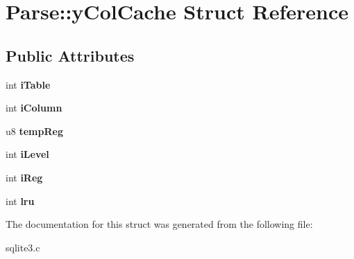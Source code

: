 \hypertarget{struct_parse_1_1y_col_cache}{\section{Parse\-:\-:y\-Col\-Cache Struct Reference}
\label{struct_parse_1_1y_col_cache}
}
\subsection*{Public Attributes}
\begin{DoxyCompactItemize}
\item 
\hypertarget{struct_parse_1_1y_col_cache_a7d99a4e00555cb0ff7fb3990bb7b549e}{int {\bfseries i\-Table}}\label{struct_parse_1_1y_col_cache_a7d99a4e00555cb0ff7fb3990bb7b549e}

\item 
\hypertarget{struct_parse_1_1y_col_cache_a67bdb189ef88aca5fc30b551da9a0f90}{int {\bfseries i\-Column}}\label{struct_parse_1_1y_col_cache_a67bdb189ef88aca5fc30b551da9a0f90}

\item 
\hypertarget{struct_parse_1_1y_col_cache_a61561cab1ce2e1914083777ae84c8fe8}{u8 {\bfseries temp\-Reg}}\label{struct_parse_1_1y_col_cache_a61561cab1ce2e1914083777ae84c8fe8}

\item 
\hypertarget{struct_parse_1_1y_col_cache_a656ea77cf538db00249221de58fd9066}{int {\bfseries i\-Level}}\label{struct_parse_1_1y_col_cache_a656ea77cf538db00249221de58fd9066}

\item 
\hypertarget{struct_parse_1_1y_col_cache_aadb47e545234142bd1e9ca4803953ab0}{int {\bfseries i\-Reg}}\label{struct_parse_1_1y_col_cache_aadb47e545234142bd1e9ca4803953ab0}

\item 
\hypertarget{struct_parse_1_1y_col_cache_ac163bb2b692f3037054f92294322f999}{int {\bfseries lru}}\label{struct_parse_1_1y_col_cache_ac163bb2b692f3037054f92294322f999}

\end{DoxyCompactItemize}


The documentation for this struct was generated from the following file\-:\begin{DoxyCompactItemize}
\item 
sqlite3.\-c\end{DoxyCompactItemize}
